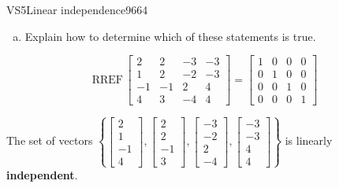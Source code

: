 \begin{exercise}{VS5}{Linear independence}{9664}
\begin{exerciseStatement}
\begin{enumerate}[(a)]
\begin{itemize}
 
\end{itemize}

     
\item  

 Explain how to determine which of these statements is true. 

 
\end{enumerate}

     \end{exerciseStatement}
 \begin{exerciseAnswer} 

 \[
\mathrm{RREF}\, \left[\begin{array}{cccc}
2 & 2 & -3 & -3 \\
1 & 2 & -2 & -3 \\
-1 & -1 & 2 & 4 \\
4 & 3 & -4 & 4
\end{array}\right] = \left[\begin{array}{cccc}
1 & 0 & 0 & 0 \\
0 & 1 & 0 & 0 \\
0 & 0 & 1 & 0 \\
0 & 0 & 0 & 1
\end{array}\right]
            \] 

 

 The set of vectors \(\left\{ \left[\begin{array}{c}
2 \\
1 \\
-1 \\
4
\end{array}\right] , \left[\begin{array}{c}
2 \\
2 \\
-1 \\
3
\end{array}\right] , \left[\begin{array}{c}
-3 \\
-2 \\
2 \\
-4
\end{array}\right] , \left[\begin{array}{c}
-3 \\
-3 \\
4 \\
4
\end{array}\right] \right\}\) is linearly \textbf{independent}. 

 \end{exerciseAnswer}
 \end{exercise}


